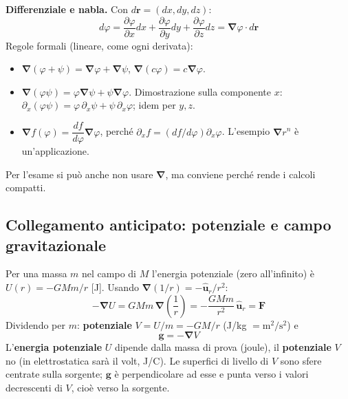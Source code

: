 \documentclass[11pt,a4paper]{article}
\newcommand{\vv}[1]{\mathbf{#1}}
\newcommand{\ur}{\hat{\mathbf{u}}_r}
\newcommand{\pd}[2]{\dfrac{\partial #1}{\partial #2}}
\newcommand{\nab}{\boldsymbol{\nabla}}
\begin{document}
\textbf{Differenziale e nabla.} Con $d\vv r=(dx,dy,dz)$:
\begin{equation}
d\varphi=\pd\varphi xdx+\pd\varphi ydy+\pd\varphi zdz=\nab\varphi\cdot d\vv r
\end{equation}
Regole formali (lineare, come ogni derivata):
\begin{itemize}[nosep]
\item $\nab(\varphi+\psi)=\nab\varphi+\nab\psi$, $\nab(c\varphi)=c\nab\varphi$.
\item $\nab(\varphi\psi)=\varphi\nab\psi+\psi\nab\varphi$. Dimostrazione sulla componente $x$: $\partial_x(\varphi\psi)=\varphi\,\partial_x\psi+\psi\,\partial_x\varphi$; idem per $y,z$.
\item $\nab f(\varphi)=\dfrac{df}{d\varphi}\nab\varphi$, perché $\partial_xf=(df/d\varphi)\partial_x\varphi$. L'esempio $\nab r^n$ è un'applicazione.
\end{itemize}
Per l'esame si può anche non usare $\nab$, ma conviene perché rende i calcoli compatti.

\subsection{Collegamento anticipato: potenziale e campo gravitazionale}\label{sec:pot}
Per una massa $m$ nel campo di $M$ l'energia potenziale (zero all'infinito) è $U(r)=-GMm/r$ [J]. Usando $\nab(1/r)=-\ur/r^2$:
\begin{equation}
-\nab U=GMm\,\nab\!\left(\frac1r\right)=-\frac{GMm}{r^2}\,\ur=\vv F
\end{equation}
Dividendo per $m$: \textbf{potenziale} $V=U/m=-GM/r$ (J/kg $=\mathrm{m^2/s^2}$) e
\begin{equation}
\vv g=-\nab V
\end{equation}
L'\textbf{energia potenziale} $U$ dipende dalla massa di prova (joule), il \textbf{potenziale} $V$ no (in elettrostatica sarà il volt, J/C). Le superfici di livello di $V$ sono sfere centrate sulla sorgente; $\vv g$ è perpendicolare ad esse e punta verso i valori decrescenti di $V$, cioè verso la sorgente.

\end{document}
